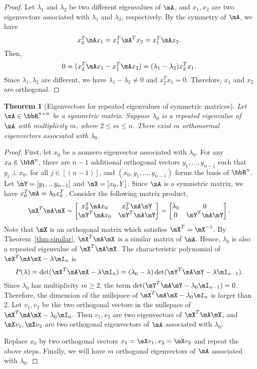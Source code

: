 \documentclass[11pt]{article}
\theoremstyle{plain}
\newtheorem{thm}{Theorem}[section]
\theoremstyle{definition}
\begin{document}
\begin{proof}
	Let $\lambda_1$ and $\lambda_2$ be two different eigenvalues of $\mA$, and  $x_1, x_2$ are two eigenvectors associated with $\lambda_1$ and $\lambda_2$, respectively. By the symmetry of $\mA$, we have
	\[ x_2^T \mA x_1 = x_1^T \mA^T x_2  = x_1^T \mA x_2.\]
	Then,
	\[  0 = ( x_2^T \mA x_1 -  x_1^T \mA x_2 ) = (\lambda_1 - \lambda_2) x_2^T x_1. \]
	Since $\lambda_1, \lambda_2$ are different, we have $\lambda_1 - \lambda_2 \neq 0$ and $x_2^T x_1 = 0$. Therefore, $x_1$ and $x_2$ are orthogonal. 
\end{proof}

\begin{thm}[Eigenvectors for repeated eigenvalues of symmetric matrices]\label{thm:symmrepeat} Let  $\mA \in \bbR^{n \times n}$ be a symmetric matrix. Suppose $\lambda_0$ is a repeated eigenvalue of $\mA$ with multiplicity $m$, where $2 \leq m \leq n$. There exist $m$ orthonormal eigenvectors associated with $\lambda_0$.
\end{thm}

\begin{proof}
	First, let $x_0$ be a nonzero eigenvector associated with $\lambda_0$. For any $x_0 \in \bbR^{n}$, there are $n-1$ additional orthogonal vectors $y_1,...,y_{n-1}$ such that $y_j \perp x_0$, for all $j \in [(n-1)]$,  and $(x_0, y_1,...,y_{n-1})$ forms the basis of $\bbR^n$. Let $\mY = [y_1,...y_{n-1}]$ and $\mX = [x_0,Y]$. Since $\mA$ is a symmetric matrix, we have $x_0^T \mA = \lambda_0 x_0^T $. Consider the following matrix product,
	\begin{align}\label{eq:symmrepeat}
		\mX^T \mA \mX =  \begin{bmatrix}
			x_0^T \mA x_0 & x_0^T \mA \mY\\
			\mY^T \mA x_0 & \mY^T \mA \mY 
		\end{bmatrix} =  \begin{bmatrix}
			\lambda_0 & 0\\
			0 & \mY^T \mA \mY 
		\end{bmatrix} .
	\end{align}
	Note that $\mX$ is an orthogonal matrix which satisfies $\mX^T = \mX^{-1}$. By Theorem~\ref{thm:similar}, $\mX^T \mA \mX$ is a similar matrix of $\mA$. Hence, $\lambda_0$ is also a repeated eigenvalue of $\mX^T \mA \mX$. The characteristic  polynomial of $\mX^T \mA \mX - \lambda \mI_n$ is 
	\[  P(\lambda) = \det(\mX^T \mA \mX - \lambda \mI_n) = (\lambda_0 - \lambda) \det(\mY^T \mA \mY - \lambda \mI_{n-1}). \]
	Since $\lambda_0$ has multiplicity $m \geq 2$, the term $\det(\mY^T \mA \mY - \lambda_0 \mI_{n-1}) = 0$. Therefore, the dimension of the nullspace of $\mX^T \mA \mX - \lambda_0 \mI_n$ is larger than 2. Let $v_1,v_2$ be the two orthogonal vectors in the nullspace of $\mX^T \mA \mX - \lambda_0 \mI_n$. Then $v_1, v_2$ are two eigenvectors of $\mX^T \mA \mX$, and $\mX v_1, \mX v_2$ are two orthogonal eigenvectors of $\mA$ associated with $\lambda_0$. 
	
	Replace $x_0$ by two orthogonal vectors $x_1 = \mX v_1, x_2 = \mX v_2$ and repeat the above steps. Finally, we will have $m$ orthogonal eigenvectors of $\mA$ associated with $\lambda_0$.
\end{proof}
\end{document}
